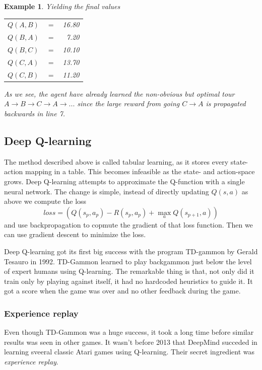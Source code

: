 \documentclass{article}
\theoremstyle{changedot}
\theoremstyle{changedotbreak}
\theoremstyle{nonumberplain}
\newtheorem{example}{Example}
\begin{document}
\begin{example}
  Yielding the final values

  \begin{tabular}{l c r}
    $Q(A, B)$ & $=$ & 16.80\\
    $Q(B, A)$ & $=$ & 7.20\\
    $Q(B, C)$ & $=$ & 10.10\\
    $Q(C, A)$ & $=$ & 13.70\\
    $Q(C, B)$ & $=$ & 11.20\\
  \end{tabular}

  As we see, the agent have already learned the non-obvious but optimal tour $A \rightarrow B \rightarrow C  \rightarrow A \rightarrow ...$ since the large reward from going $C \rightarrow A$ is propagated backwards in line 7. 
\end{example}


\subsection{Deep Q-learning}
The method described above is called tabular learning, as it stores every state-action mapping in a table. This becomes infeasible as the state- and action-space grows. Deep Q-learning attempts to approximate the Q-function with a single neural network. The change is simple, instead of directly updating $Q(s, a)$ as above we compute the loss \[loss = (Q(s_{p}, a_{p}) - R(s_{p}, a_{p}) + \max_{a} Q(s_{p+1}, a))\] and use backpropagation to copmute the gradient of that loss function. Then we can use gradient descent to minimize the loss.

Deep Q-learning got its first big success with the program TD-gammon by Gerald Tesauro in 1992. TD-Gammon learned to play backgammon just below the level of expert humans using Q-learning. The remarkable thing is that, not only did it train only by playing against itself, it had no hardcoded heuristics to guide it. It got a score when the game was over and no other feedback during the game.

\subsubsection{Experience replay}
Even though TD-Gammon was a huge success, it took a long time before similar results was seen in other games. It wasn't before 2013 that DeepMind succeded in learning sveeral classic Atari games using Q-learning. Their secret ingredient was \emph{experience replay}.
\end{document}
